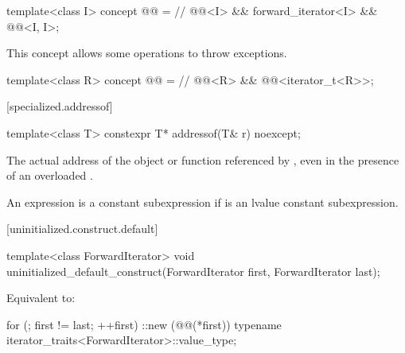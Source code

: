 \begin{itemdecl}
template<class I>
concept @@ = // \expos
  @@<I> &&
  forward_iterator<I> &&
  @@<I, I>;
\end{itemdecl}

\begin{itemdescr}
\pnum
\begin{note}
This concept allows some 
operations to throw exceptions.
\end{note}
\end{itemdescr}

\begin{itemdecl}
template<class R>
concept @@ = // \expos
  @@<R> &&
  @@<iterator_t<R>>;
\end{itemdecl}

[specialized.addressof]{}

%
\begin{itemdecl}
template<class T> constexpr T* addressof(T& r) noexcept;
\end{itemdecl}

\begin{itemdescr}
\pnum
\returns
The actual address of the object or function referenced by , even in the
presence of an overloaded .

\pnum
\remarks
An expression 
is a constant subexpression
if  is an lvalue constant subexpression.
\end{itemdescr}

[uninitialized.construct.default]{}

%
\begin{itemdecl}
template<class ForwardIterator>
  void uninitialized_default_construct(ForwardIterator first, ForwardIterator last);
\end{itemdecl}

\begin{itemdescr}
\pnum
\effects
Equivalent to:
\begin{codeblock}
for (; first != last; ++first)
  ::new (@@(*first))
    typename iterator_traits<ForwardIterator>::value_type;
\end{codeblock}
\end{itemdescr}

